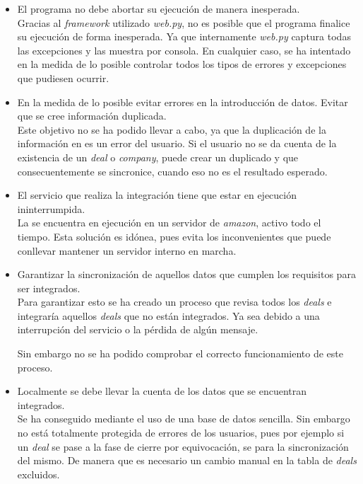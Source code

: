 \begin{itemize}
	\item El programa no debe abortar su ejecución de manera inesperada.\\
	
	Gracias al \textit{framework} utilizado \textit{web.py}, no es posible que el programa finalice su ejecución de forma inesperada. 
	Ya que internamente \textit{web.py} captura todas las excepciones y las muestra por consola. En cualquier caso, se ha intentado en la medida de lo posible controlar todos los tipos de errores y excepciones que pudiesen ocurrir.
	
	\item En la medida de lo posible evitar errores en la introducción de datos. Evitar que se cree información duplicada.\\
	
	Este objetivo no se ha podido llevar a cabo, ya que la duplicación de la información en \hs{} es un error del usuario. Si el usuario no se da cuenta de la existencia de un \textit{deal} o \textit{company}, puede crear un duplicado y que consecuentemente se sincronice, cuando eso no es el resultado esperado.
	
	
	\item El servicio que realiza la integración tiene que estar en ejecución ininterrumpida.\\
	
	La \iface{} se encuentra en ejecución en un servidor de \textit{amazon}, activo todo el tiempo. Esta solución es idónea, pues evita los inconvenientes que puede conllevar mantener un servidor interno en marcha.
	
	\item Garantizar la sincronización de aquellos datos que cumplen los requisitos para ser integrados.\\
	
	Para garantizar esto se ha creado un proceso que revisa todos los \textit{deals} e integraría aquellos \textit{deals} que no están integrados. 
	Ya sea debido a una interrupción del servicio o la pérdida de algún mensaje.
	
	Sin embargo no se ha podido comprobar el correcto funcionamiento de este proceso.
	\item Localmente se debe llevar la cuenta de los datos que se encuentran integrados.\\
	
	Se ha conseguido mediante el uso de una base de datos sencilla.
	Sin embargo no está totalmente protegida de errores  de los usuarios, pues por ejemplo si un \textit{deal} se pase a la fase de cierre por equivocación, se para la sincronización del mismo.
	De manera que es necesario un cambio manual en la tabla de \textit{deals} excluidos.
	

\end{itemize}
